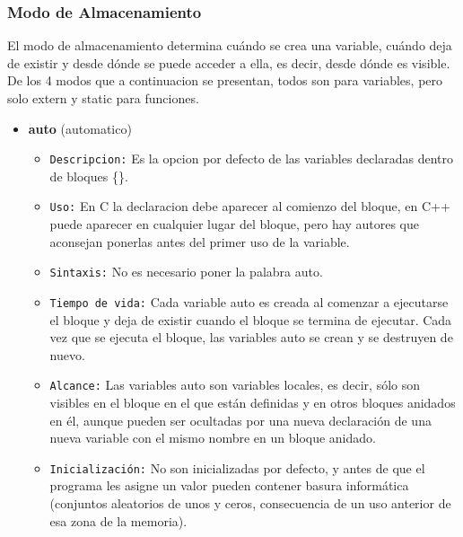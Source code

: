 \documentclass[letterpaper]{report}
\begin{document}
\subsubsection*{Modo de Almacenamiento}
El modo de almacenamiento determina cuándo se crea una variable, cuándo deja de existir y desde dónde se puede
acceder a ella, es decir, desde dónde es visible.\\
De los 4 modos que a continuacion se presentan, todos son para variables, pero solo extern y static para funciones.
\begin{itemize}
  \item \textbf{auto} (automatico)
  \begin{itemize}
  \item \texttt{Descripcion:} Es la opcion por defecto de las variables declaradas dentro de bloques \{\}.
  \item \texttt{Uso:} En C la declaracion debe aparecer al comienzo del bloque, en C++ puede aparecer en cualquier lugar del bloque, pero hay autores que aconsejan ponerlas antes del primer uso de la variable.
  \item \texttt{Sintaxis:} No es necesario poner la palabra auto. 
  \item \texttt{Tiempo de vida:} Cada variable auto es creada al comenzar a ejecutarse el bloque y deja de existir cuando el bloque se termina de ejecutar. Cada vez que se ejecuta el bloque, las variables auto se crean y se destruyen de nuevo.
  \item \texttt{Alcance:} Las variables auto son variables locales, es decir, sólo son visibles en el bloque en el que están definidas y en otros bloques anidados en él, aunque pueden ser ocultadas por una nueva declaración de una nueva variable con el mismo nombre en un bloque anidado.
  \item \texttt{Inicialización:} No son inicializadas por defecto, y antes de que el programa les asigne un valor pueden contener basura informática (conjuntos aleatorios de unos y ceros, consecuencia de un uso anterior de esa zona de la memoria).
  \end{itemize}


\end{itemize}
\end{document}
